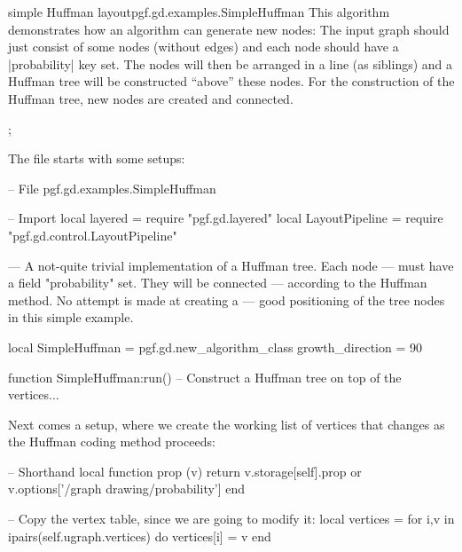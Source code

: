 \begin{gdalgorithm}{simple Huffman layout}{pgf.gd.examples.SimpleHuffman}
  This algorithm demonstrates how an algorithm can generate new
  nodes: The input graph should just consist of some nodes (without
  edges) and each node should have a |probability| key set. The nodes
  will then be arranged in a line (as siblings) and a Huffman tree
  will be constructed ``above'' these nodes. For the construction of
  the Huffman tree, new nodes are created and connected.

\begin{codeexample}[]
\tikz {};    
\end{codeexample}
  The file starts with some setups:
\begin{codeexample}
-- File pgf.gd.examples.SimpleHuffman

-- Import
local layered = require "pgf.gd.layered"
local LayoutPipeline = require "pgf.gd.control.LayoutPipeline"

--- A not-quite trivial implementation of a Huffman tree. Each node
--- must have a field "probability" set. They will be connected
--- according to the Huffman method. No attempt is made at creating a
--- good positioning of the tree nodes in this simple example.

local SimpleHuffman = pgf.gd.new_algorithm_class {
  growth_direction = 90
}

function SimpleHuffman:run()
  -- Construct a Huffman tree on top of the vertices...
\end{codeexample}

  Next comes a setup, where we create the working list of vertices
  that changes as the Huffman coding method proceeds:
\begin{codeexample}
  -- Shorthand
  local function prop (v) return v.storage[self].prop or v.options['/graph drawing/probability'] end
  
  -- Copy the vertex table, since we are going to modify it:
  local vertices = {}
  for i,v in ipairs(self.ugraph.vertices) do
    vertices[i] = v
  end
\end{codeexample}


\end{gdalgorithm}
